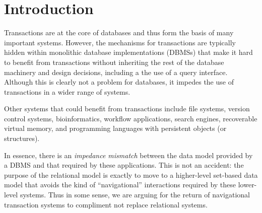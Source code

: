 \documentclass[letterpaper,twocolumn,english]{article}
\begin{document}

\section{Introduction}

Transactions are at the core of databases and thus form the basis of many
important systems. However, the mechanisms for transactions are
typically hidden within monolithic database implementations (DBMSs) that make
it hard to benefit from transactions without inheriting the rest of
the database machinery and design decisions, including a the use of a
query interface.  Although this is clearly not a problem for
databases, it impedes the use of transactions in a wider range of
systems.

Other systems that could benefit from transactions include file
systems, version control systems, bioinformatics, workflow
applications, search engines, recoverable virtual memory, and
programming languages with persistent objects (or structures).

In essence, there is an {\em impedance mismatch} between the data
model provided by a DBMS and that required by these applications. This is
not an accident: the purpose of the relational model is exactly to
move to a higher-level set-based data model that avoids the kind of
``navigational'' interactions required by these lower-level systems.
Thus in some sense, we are arguing for the return of navigational
transaction systems to compliment not replace relational systems.
\end{document}

